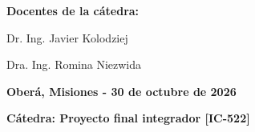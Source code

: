 \begin{titlepage}
\begin{flushleft}
        \vspace{0.25 cm}
        \Large \textbf{Docentes de la cátedra:} \par
        \Large \hspace{0.5 cm} Dr. Ing. Javier Kolodziej \par
        \Large \hspace{0.5 cm} Dra. Ing. Romina Niezwida 
    \end{flushleft}
    \vspace{1.5 cm}

    {\Large \textbf{Oberá, Misiones - 30 de octubre de 2026}} \par
    \Large \textbf{Cátedra: Proyecto final integrador [IC-522]} 
    
\end{titlepage}